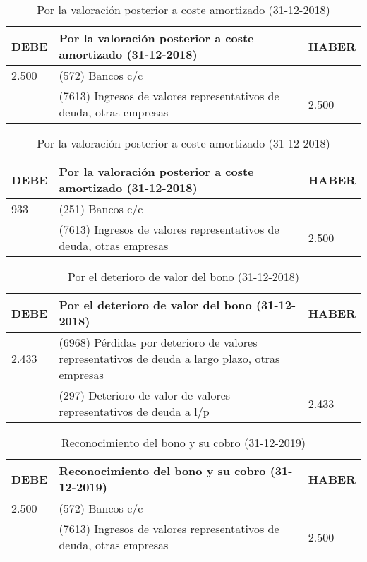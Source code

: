 \begin{table}[H]
    \centering
    \begin{tabular}{|p{3cm}|p{6cm}|p{3cm}|}
    \hline
    \rowcolor{blue!30}
    \textbf{DEBE} & \textbf{Por la valoración posterior a coste amortizado (31-12-2018)} & \textbf{HABER} \\
    \hline
    2.500 & (572) Bancos c/c & \\
    \hline
    & (7613) Ingresos de valores representativos de deuda, otras empresas & 2.500 \\
    \hline
    \end{tabular}
    \caption{Por la valoración posterior a coste amortizado (31-12-2018)}
    \label{tabla:valoracion_posterior}
\end{table}

\begin{table}[H]
    \centering
    \begin{tabular}{|p{3cm}|p{6cm}|p{3cm}|}
    \hline
    \rowcolor{blue!30}
    \textbf{DEBE} & \textbf{Por la valoración posterior a coste amortizado (31-12-2018)} & \textbf{HABER} \\
    \hline
    933 & (251) Bancos c/c & \\
    \hline
    & (7613) Ingresos de valores representativos de deuda, otras empresas & 2.500 \\
    \hline
    \end{tabular}
    \caption{Por la valoración posterior a coste amortizado (31-12-2018)}
    \label{tabla:valoracion_posterior2}
\end{table}


\begin{table}[H]
    \centering
    \begin{tabular}{|p{2cm}|p{6cm}|p{2cm}|}
    \hline
    \rowcolor{blue!30}
    \textbf{DEBE} & \textbf{Por el deterioro de valor del bono (31-12-2018)} & \textbf{HABER} \\
    \hline
    2.433 & (6968) Pérdidas por deterioro de valores representativos de deuda a largo plazo, otras empresas & \\
    \hline
    & (297) Deterioro de valor de valores representativos de deuda a l/p & 2.433 \\
    \hline
    \end{tabular}
    \caption{Por el deterioro de valor del bono (31-12-2018)}
    \label{tabla:deterioro_valor_bono}
\end{table}

\begin{table}[H]
    \centering
    \begin{tabular}{|p{2cm}|p{6cm}|p{2cm}|}
    \hline
    \rowcolor{blue!30}
    \textbf{DEBE} & \textbf{Reconocimiento del bono y su cobro (31-12-2019)} & \textbf{HABER} \\
    \hline
    2.500 & (572) Bancos c/c & \\
    \hline
    & (7613) Ingresos de valores representativos de deuda, otras empresas & 2.500 \\
    \hline
    \end{tabular}
    \caption{Reconocimiento del bono y su cobro (31-12-2019)}
    \label{tabla:reconocimiento_bono}
\end{table}

